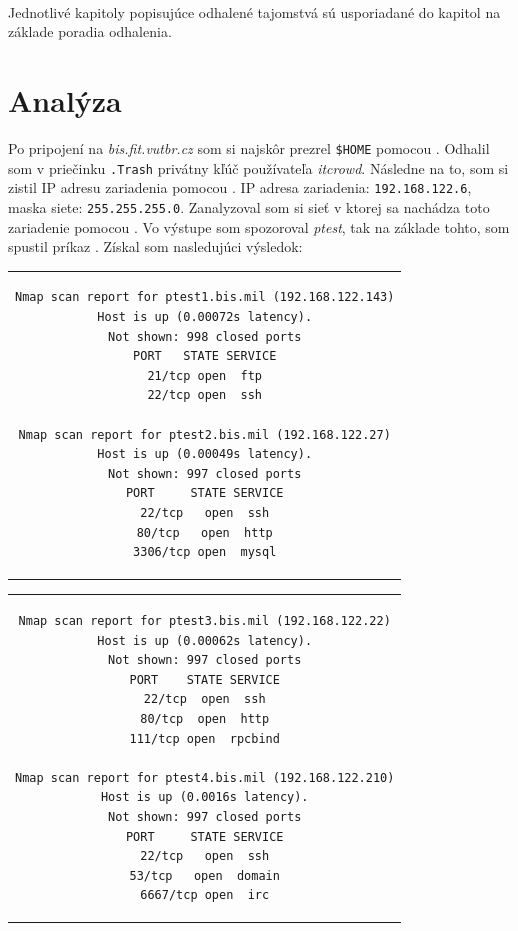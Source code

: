 \documentclass[11pt,a4paper]{article}
\begin{document}
\hfill\\

Jednotlivé kapitoly popisujúce odhalené tajomstvá sú usporiadané do kapitol na základe poradia odhalenia.

\section{Analýza}\label{sec:analysis}

Po pripojení na \textit{bis.fit.vutbr.cz} som si najskôr prezrel \texttt{\$HOME} pomocou . Odhalil som v priečinku \texttt{.Trash} privátny kľúč používateľa \textit{itcrowd}. Následne na to, som si zistil IP adresu zariadenia pomocou . IP adresa zariadenia: \texttt{192.168.122.6}, maska siete: \texttt{255.255.255.0}. Zanalyzoval som si sieť v ktorej sa nachádza toto zariadenie pomocou . Vo výstupe som spozoroval \textit{ptest}, tak na základe tohto, som spustil príkaz . Získal som nasledujúci výsledok:

\begin{center}
\begin{tabular}{c}
\begin{lstlisting}[basicstyle=\small]
Nmap scan report for ptest1.bis.mil (192.168.122.143)
Host is up (0.00072s latency).
Not shown: 998 closed ports
PORT   STATE SERVICE
21/tcp open  ftp
22/tcp open  ssh

Nmap scan report for ptest2.bis.mil (192.168.122.27)
Host is up (0.00049s latency).
Not shown: 997 closed ports
PORT     STATE SERVICE
22/tcp   open  ssh
80/tcp   open  http
3306/tcp open  mysql
\end{lstlisting}
\end{tabular}
\end{center}

\begin{center}
\begin{tabular}{c}
\begin{lstlisting}[basicstyle=\small]
Nmap scan report for ptest3.bis.mil (192.168.122.22)
Host is up (0.00062s latency).
Not shown: 997 closed ports
PORT    STATE SERVICE
22/tcp  open  ssh
80/tcp  open  http
111/tcp open  rpcbind

Nmap scan report for ptest4.bis.mil (192.168.122.210)
Host is up (0.0016s latency).
Not shown: 997 closed ports
PORT     STATE SERVICE
22/tcp   open  ssh
53/tcp   open  domain
6667/tcp open  irc
\end{lstlisting}
\end{tabular}
\end{center}
\end{document}
